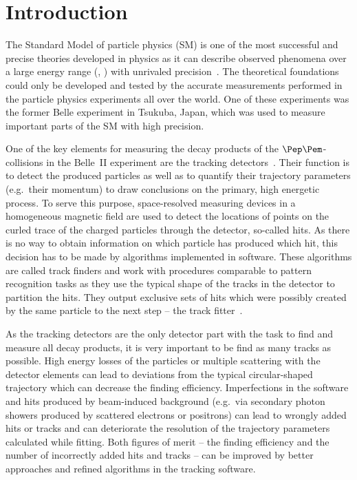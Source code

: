 \chapter{Introduction}


The Standard Model of particle physics (SM) is one of the most successful and precise theories developed in physics as it can describe observed phenomena over a large energy range (\cite{omg}, \cite{hydrogen}) with unrivaled precision~\cite{mu}. The theoretical foundations could only be developed and tested by the accurate measurements performed in the particle physics experiments all over the world. One of these experiments was the former Belle experiment in Tsukuba, Japan, which was used to measure important parts of the SM with high precision. 


One of the key elements for measuring the decay products of the $\Pep\Pem$-collisions in the Belle~II experiment are the tracking detectors~\cite{tdr}. Their function is to detect the produced particles as well as to quantify their trajectory parameters (e.g.\ their momentum) to draw conclusions on the primary, high energetic process. To serve this purpose, space-resolved measuring devices in a homogeneous magnetic field are used to detect the locations of points on the curled trace of the charged particles through the detector, so-called hits. As there is no way to obtain information on which particle has produced which hit, this decision has to be made by algorithms implemented in software. These algorithms are called track finders and work with procedures comparable to pattern recognition tasks as they use the typical shape of the tracks in the detector to partition the hits. They output exclusive sets of hits which were possibly created by the same particle to the next step -- the track fitter~\cite{genfit}. 

As the tracking detectors are the only detector part with the task to find and measure all decay products, it is very important to be find as many tracks as possible. High energy losses of the particles or multiple scattering with the detector elements can lead to deviations from the typical circular-shaped trajectory which can decrease the finding efficiency. Imperfections in the software and hits produced by beam-induced background (e.g.\ via secondary photon showers produced by scattered electrons or positrons) can lead to wrongly added hits or tracks and can deteriorate the resolution of the trajectory parameters calculated while fitting. Both figures of merit -- the finding efficiency and the number of incorrectly added hits and tracks -- can be improved by better approaches and refined algorithms in the tracking software.

